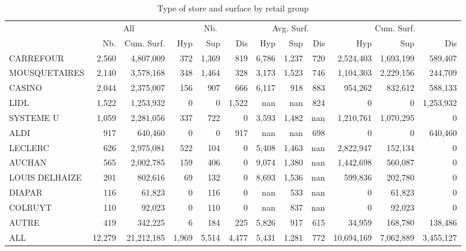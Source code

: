 \documentclass[11pt]{article}
\begin{document}
\begin{table}[H]
\caption{Type of store and surface by retail group}
\footnotesize
\setlength{\tabcolsep}{2pt}

\begin{tabular}{l|rr|rrr|rrr|rrr}
\toprule
{} & \multicolumn{2}{c|}{All} &   \multicolumn{3}{c|}{Nb.}   &   \multicolumn{3}{c|}{Avg. Surf.}   &   \multicolumn{3}{c}{Cum. Surf.} \\
{} &        Nb. &  Cum. Surf. &        Hyp &        Sup &      Dis &        Hyp &        Sup &      Dis &        Hyp &        Sup &      Dis \\
\midrule
CARREFOUR      &      2,560 &   4,807,009 &        372 &      1,369 &        819 &      6,786 &      1,237 &        720 &  2,524,403 &  1,693,199 &    589,407 \\
MOUSQUETAIRES  &      2,140 &   3,578,168 &        348 &      1,464 &        328 &      3,173 &      1,523 &        746 &  1,104,303 &  2,229,156 &    244,709 \\
CASINO         &      2,044 &   2,375,007 &        156 &        907 &        666 &      6,117 &        918 &        883 &    954,262 &    832,612 &    588,133 \\
LIDL           &      1,522 &   1,253,932 &          0 &          0 &      1,522 &        nan &        nan &        824 &          0 &          0 &  1,253,932 \\
SYSTEME U      &      1,059 &   2,281,056 &        337 &        722 &          0 &      3,593 &      1,482 &        nan &  1,210,761 &  1,070,295 &          0 \\
ALDI           &        917 &     640,460 &          0 &          0 &        917 &        nan &        nan &        698 &          0 &          0 &    640,460 \\
LECLERC        &        626 &   2,975,081 &        522 &        104 &          0 &      5,408 &      1,463 &        nan &  2,822,947 &    152,134 &          0 \\
AUCHAN         &        565 &   2,002,785 &        159 &        406 &          0 &      9,074 &      1,380 &        nan &  1,442,698 &    560,087 &          0 \\
LOUIS DELHAIZE &        201 &     802,616 &         69 &        132 &          0 &      8,693 &      1,536 &        nan &    599,836 &    202,780 &          0 \\
DIAPAR         &        116 &      61,823 &          0 &        116 &          0 &        nan &        533 &        nan &          0 &     61,823 &          0 \\
COLRUYT        &        110 &      92,023 &          0 &        110 &          0 &        nan &        837 &        nan &          0 &     92,023 &          0 \\
AUTRE          &        419 &     342,225 &          6 &        184 &        225 &      5,826 &        917 &        615 &     34,959 &    168,780 &    138,486 \\
\midrule
ALL            &     12,279 &  21,212,185 &      1,969 &      5,514 &      4,477 &      5,431 &      1,281 &        772 & 10,694,169 &  7,062,889 &  3,455,127 \\
\bottomrule
\end{tabular}


\end{table}
\end{document}
